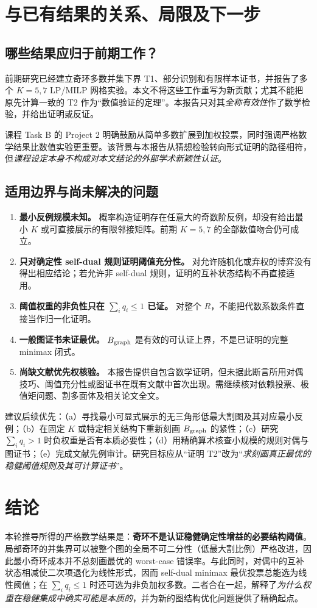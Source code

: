 \documentclass[11pt,a4paper]{ctexart}
\theoremstyle{definition}
\begin{document}
\section{与已有结果的关系、局限及下一步}
\subsection{哪些结果应归于前期工作？}
前期研究已经建立奇环多数并集下界 T1、部分识别和有限样本证书，并报告了多个 $K=5,7$ LP/MILP 网格实验。本文不将这些工作重写为新贡献；尤其不能把原先计算一致的 T2 作为“数值验证的定理”。本报告只对其\emph{全称有效性}作了数学检验，并给出证明或反证。

课程 Task B 的 Project 2 明确鼓励从简单多数扩展到加权投票，同时强调严格数学结果比数值实验更重要。该背景与本报告从猜想检验转向形式证明的路径相符，但\emph{课程设定本身不构成对本文结论的外部学术新颖性认证}。

\subsection{适用边界与尚未解决的问题}
\begin{enumerate}[label=\arabic*.]
\item \textbf{最小反例规模未知。} 概率构造证明存在任意大的奇数阶反例，却没有给出最小 $K$ 或可直接展示的有限邻接矩阵。前期 $K=5,7$ 的全部数值吻合仍可成立。
\item \textbf{只对确定性 self-dual 规则证明阈值充分性。} 对允许随机化或弃权的博弈没有得出相应结论；若允许非 self-dual 规则，证明的互补状态结构不再直接适用。
\item \textbf{阈值权重的非负性只在 $\sum_iq_i\le1$ 已证。} 对整个 $R$，不能把代数系数条件直接当作归一化证明。
\item \textbf{一般图证书未证最优。} $B_{\rm graph}$ 是有效的可认证上界，不是已证明的完整 minimax 闭式。
\item \textbf{尚缺文献优先权核验。} 本报告提供自包含数学证明，但未据此断言所用对偶技巧、阈值充分性或图证书在既有文献中首次出现。需继续核对依赖投票、极值矩问题、割多面体及相关论文全文。
\end{enumerate}

建议后续优先：（a）寻找最小可显式展示的无三角形低最大割图及其对应最小反例；（b）在固定 $K$ 或特定相关结构下重新刻画 $B_{\rm graph}$ 的紧性；（c）研究 $\sum_iq_i>1$ 时负权重是否有本质必要性；（d）用精确算术核查小规模的规则对偶与图证书；（e）完成文献先例审计。研究目标应从“证明 T2”改为“\emph{求刻画真正最优的稳健阈值规则及其可计算证书}”。

\section*{结论}
本轮推导所得的严格数学结果是：\textbf{奇环不是认证稳健确定性增益的必要结构阈值}。局部奇环的并集界可以被整个图的全局不可二分性（低最大割比例）严格改进，因此最小奇环成本并不总刻画最优的 worst-case 错误率。与此同时，对偶中的互补状态相减使二次项退化为线性形式，因而 self-dual minimax 最优投票总能选为线性阈值；在 $\sum_iq_i\le1$ 时还可选为非负加权多数。二者合在一起，解释了\emph{为什么权重在稳健集成中确实可能是本质的}，并为新的图结构优化问题提供了精确起点。
\end{document}
